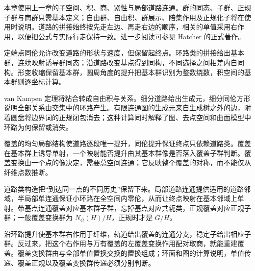\ProseParagraphBreak

本章使用上一章的子空间、积、商、紧性与局部道路连通。群的同态、子群、正规子群与商群只需基本定义；自由群、自由积、群展示、陪集作用及正规化子将在使用时说明。道路的拼接始终按先走左边、再走右边的顺序，相关的单值采用右作用，以便把公式与实际行走保持一致。进一步阅读可参见 Hatcher 的正式著作\cite[第1.1--1.3节; 第1.A节]{Hatcher2002}。







\begin{chaptersummary}
	定端点同伦允许改变道路的形状与速度，但保留起终点。环路类的拼接给出基本群，连续映射诱导群同态；沿道路改变基点得到同构，不同选择之间相差内自同构。形变收缩保留基本群，圆周角度的提升把基本群识别为整数绕数，积空间的基本群则逐坐标计算。

	\ProseParagraphBreak

	van Kampen 定理将粘合转成自由积与关系。细分道路给出生成元，细分同伦方形说明全部关系由交集中的环路产生。有限连通图的生成元来自生成树之外的边，附着圆盘将边界词的正规闭包消去；这种计算同时解释了图、去点空间和曲面模型中环路为何保留或消失。

	\ProseParagraphBreak

	覆盖的均匀局部结构使道路逐段唯一提升，同伦提升保证终点只依赖道路类。覆盖在基本群上诱导单射，一个映射能否提升由其基本群像是否落入覆盖子群判断。覆盖变换由一个点的像决定，需要总空间连通；它反映整个覆盖的对称，而不能仅从纤维点数推断。

	\ProseParagraphBreak

	道路类构造把“到达同一点的不同历史”保留下来。局部道路连通提供适用的道路邻域，半局部单连通保证小环路在全空间内零伦，从而让终点映射在基本邻域上单射。带基点连通覆盖对应基本群子群，忘掉基点对应共轭类，正规覆盖对应正规子群；一般覆盖变换群为 \(N_G(H)/H\)，正规时才是 \(G/H\)。

	\ProseParagraphBreak

	沿环路提升使基本群右作用于纤维，轨道给出覆盖的连通分支，稳定子给出相应子群。反过来，把这个右作用与万有覆盖的左覆盖变换作用配对取商，就能重建覆盖。覆盖变换群由与全部单值置换交换的置换组成；环面和图的计算说明，单值传递、覆盖正规以及覆盖变换群传递必须分别判断。
\end{chaptersummary}

\BookExercises

